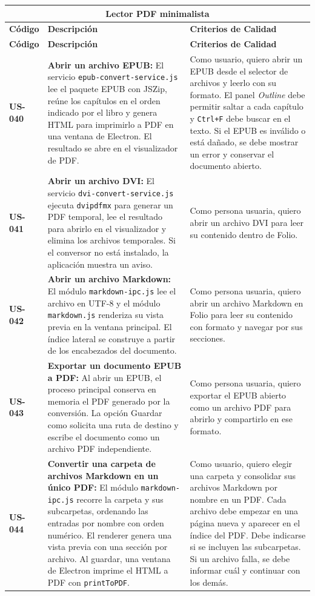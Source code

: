 \begin{longtable}{|l||p{7cm}|p{4.5cm}|}

\multicolumn{3}{c}{Lector PDF minimalista}\\
\hline
\textbf{Código} & \textbf{Descripción} & \textbf{Criterios de Calidad}\\
\hline\hline
\endfirsthead
\hline
\textbf{Código} & \textbf{Descripción} & \textbf{Criterios de Calidad}\\
\hline\hline
\endhead

\textbf{US-040} & \textbf{Abrir un archivo EPUB:} El servicio \texttt{epub-convert-service.js} lee el paquete EPUB con JSZip, reúne los capítulos en el orden indicado por el libro y genera HTML para imprimirlo a PDF en una ventana de Electron. El resultado se abre en el visualizador de PDF. & Como usuario, quiero abrir un EPUB desde el selector de archivos y leerlo con su formato. El panel \emph{Outline} debe permitir saltar a cada capítulo y \texttt{Ctrl+F} debe buscar en el texto. Si el EPUB es inválido o está dañado, se debe mostrar un error y conservar el documento abierto.\\
\hline
\textbf{US-041} & \textbf{Abrir un archivo DVI:} El servicio \texttt{dvi-convert-service.js} ejecuta \texttt{dvipdfmx} para generar un PDF temporal, lee el resultado para abrirlo en el visualizador y elimina los archivos temporales. Si el conversor no está instalado, la aplicación muestra un aviso. & Como persona usuaria, quiero abrir un archivo DVI para leer su contenido dentro de Folio.\\
\hline
\textbf{US-042} & \textbf{Abrir un archivo Markdown:} El módulo \texttt{markdown-ipc.js} lee el archivo en UTF-8 y el módulo \texttt{markdown.js} renderiza su vista previa en la ventana principal. El índice lateral se construye a partir de los encabezados del documento. & Como persona usuaria, quiero abrir un archivo Markdown en Folio para leer su contenido con formato y navegar por sus secciones.\\
\hline
\textbf{US-043} & \textbf{Exportar un documento EPUB a PDF:} Al abrir un EPUB, el proceso principal conserva en memoria el PDF generado por la conversión. La opción Guardar como solicita una ruta de destino y escribe el documento como un archivo PDF independiente. & Como persona usuaria, quiero exportar el EPUB abierto como un archivo PDF para abrirlo y compartirlo en ese formato.\\
\hline
\textbf{US-044} & \textbf{Convertir una carpeta de archivos Markdown en un único PDF:} El módulo \texttt{markdown-ipc.js} recorre la carpeta y sus subcarpetas, ordenando las entradas por nombre con orden numérico. El renderer genera una vista previa con una sección por archivo. Al guardar, una ventana de Electron imprime el HTML a PDF con \texttt{printToPDF}. & Como usuario, quiero elegir una carpeta y consolidar sus archivos Markdown por nombre en un PDF. Cada archivo debe empezar en una página nueva y aparecer en el índice del PDF. Debe indicarse si se incluyen las subcarpetas. Si un archivo falla, se debe informar cuál y continuar con los demás.\\

\end{longtable}
